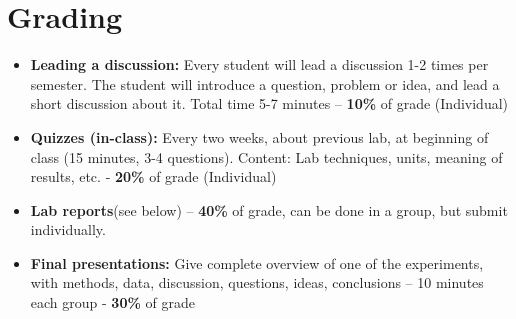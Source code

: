 \section*{Grading}
\begin{itemize}
\item \textbf{ Leading a discussion:} Every student will lead a discussion 1-2 times per semester. The student will introduce a question, problem or idea, and lead a short discussion about it. Total time 5-7 minutes – \textbf{10\%} of grade (Individual)
\item \textbf{Quizzes (in-class):} Every two weeks, about previous lab, at beginning of class (15 minutes, 3-4 questions). Content: Lab techniques, units, meaning of results, etc. - \textbf{20\%} of grade (Individual)
\item \textbf{Lab reports}(see below) – \textbf{40\%} of grade, can be done in a group, but submit individually.
\item \textbf{Final presentations:} Give complete overview of one of the experiments, with methods, data, discussion, questions, ideas, conclusions – 10 minutes each group - \textbf{30\%} of grade
\end{itemize}

